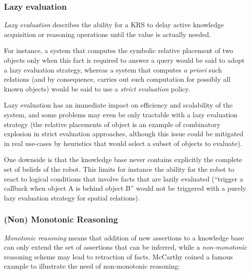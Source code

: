 \subsubsection{Lazy evaluation}
\label{sect|lazy-evaluation}

\emph{Lazy evaluation} describes the ability for a KRS to delay active
knowledge acquisition or reasoning operations until the value is actually
needed.

For instance, a system that computes the symbolic relative placement of two
objects only when this fact is required to answer a query would be said to
adopt a lazy evaluation strategy, whereas a system that computes {\it a priori}
such relations (and by consequence, carries out such computation for possibly
all known objects) would be said to use a \emph{strict evaluation} policy.

Lazy evaluation has an immediate impact on efficiency and scalability of the
system, and some problems may even be only tractable with a lazy evaluation
strategy (the relative placements of object is an example of combinatory
explosion in strict evaluation approaches, although this issue could be
mitigated in real use-cases by heuristics that would select a subset of objects
to evaluate).

One downside is that the knowledge base never contains explicitly the complete
set of beliefs of the robot. This limits for instance the ability for the robot
to react to logical conditions that involve facts that are lazily evaluated
(``trigger a callback when object A is behind object B'' would not be triggered
with a purely lazy evaluation strategy for spatial relations).


\subsubsection{(Non) Monotonic Reasoning}

\emph{Monotonic reasoning} means that addition of new assertions to a knowledge base
can only extend the set of assertions that can be inferred, while a
\emph{non-monotonic} reasoning scheme may lead to retraction of facts.
McCarthy coined a famous example to illustrate the need of non-monotonic reasoning:

